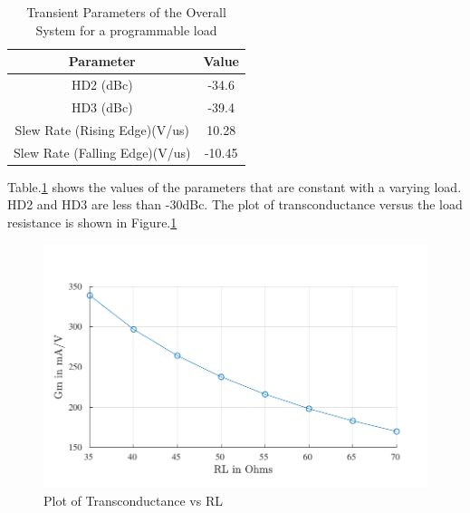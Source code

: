 \begin{table} [H]
\centering
\begin{tabular}{@{}cc@{}}
\toprule
Parameter							& Value		\\ \midrule
HD2 (dBc)							& -34.6 			\\
HD3 (dBc)							& -39.4 			\\
Slew Rate (Rising Edge)(V/us)		& 10.28 			\\
Slew Rate (Falling Edge)(V/us)		& -10.45 			\\
\bottomrule
\end{tabular}
\caption{Transient Parameters of the Overall System for a programmable load}
\label{tab:RL_trans_2}
\end{table}

Table.\ref{tab:RL_trans_2} shows the values of the parameters that are constant with a varying load. HD2 and HD3 are less than -30dBc.
The plot of transconductance versus the load resistance is shown in Figure.\ref{fig:RL_Gm}
\begin{figure} [H]
\centering
\includegraphics[scale=1]{Figures/Plots/Ov_Gm_RL.pdf}
\caption{Plot of Transconductance vs RL}
\label{fig:RL_Gm}
\end{figure}
\vfill
\clearpage

